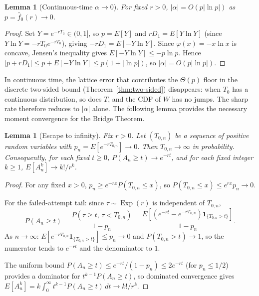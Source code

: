 \documentclass[11pt]{article}
\theoremstyle{plain}
\newtheorem{lemma}[theorem]{Lemma}
\theoremstyle{definition}
\theoremstyle{remark}
\DeclareMathOperator{\Exp}{Exp}
\begin{document}
\begin{lemma}[Continuous-time $\alpha \to 0$]\label{lem:ct-alpha}
For fixed $r > 0$, $|\alpha| = O(p|\ln p|)$ as $p = \hat{f}_0(r) \to 0$.
\end{lemma}

\begin{proof}
Set $Y = e^{-rT_0} \in (0,1]$, so $p = E[Y]$ and $rD_1 = E[Y\ln Y]$ (since $Y\ln Y = -rT_0 e^{-rT_0}$), giving $-rD_1 = E[-Y\ln Y]$.  Since $\varphi(x) = -x\ln x$ is concave, Jensen's inequality gives $E[-Y\ln Y] \leq -p\ln p$.  Hence $|p + rD_1| \leq p + E[-Y\ln Y] \leq p(1 + |\ln p|)$, so $|\alpha| = O(p|\ln p|)$.
\end{proof}







In continuous time, the lattice error that contributes the $\Theta(p)$ floor in the discrete two-sided bound (Theorem~\ref{thm:two-sided}) disappears: when $T_0$ has a continuous distribution, so does $T$, and the CDF of $W$ has no jumps.  The sharp rate therefore reduces to $|\alpha|$ alone.  The following lemma provides the necessary moment convergence for the Bridge Theorem.

\begin{lemma}[Escape to infinity]\label{lem:escape}
Fix $r > 0$.  Let $(T_{0,n})$ be a sequence of positive random variables with $p_n = E[e^{-rT_{0,n}}] \to 0$.  Then $T_{0,n} \to \infty$ in probability.  Consequently, for each fixed $t \geq 0$, $P(A_n \geq t) \to e^{-rt}$, and for each fixed integer $k \geq 1$, $E[A_n^k] \to k!/r^k$.
\end{lemma}

\begin{proof}
For any fixed $x > 0$, $p_n \geq e^{-rx}P(T_{0,n} \leq x)$, so $P(T_{0,n} \leq x) \leq e^{rx}p_n \to 0$.

For the failed-attempt tail: since $\tau \sim \Exp(r)$ is independent of $T_{0,n}$,
\[
  P(A_n \geq t) = \frac{P(\tau \geq t,\, \tau < T_{0,n})}{1-p_n}
  = \frac{E[(e^{-rt} - e^{-rT_{0,n}})\mathbf{1}_{\{T_{0,n} > t\}}]}{1-p_n}.
\]
As $n \to \infty$: $E[e^{-rT_{0,n}}\mathbf{1}_{\{T_{0,n} > t\}}] \leq p_n \to 0$ and $P(T_{0,n} > t) \to 1$, so the numerator tends to $e^{-rt}$ and the denominator to $1$.

The uniform bound $P(A_n \geq t) \leq e^{-rt}/(1-p_n) \leq 2e^{-rt}$ (for $p_n \leq 1/2$) provides a dominator for $t^{k-1}P(A_n \geq t)$, so dominated convergence gives $E[A_n^k] = k\int_0^\infty t^{k-1}P(A_n \geq t)\,dt \to k!/r^k$.
\end{proof}
\end{document}
